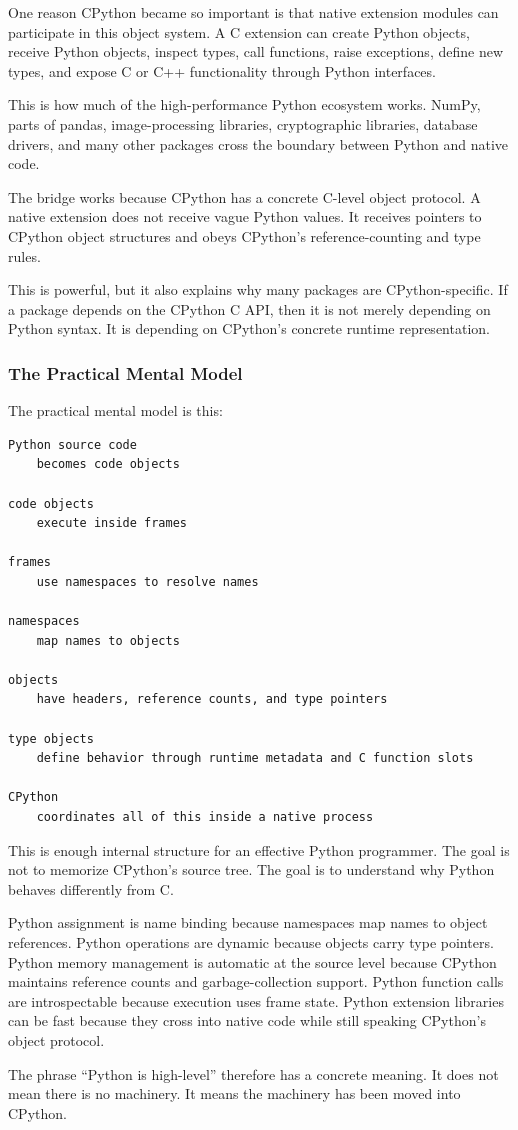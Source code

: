 One reason CPython became so important is that native extension modules can participate in this object system. A C extension can create Python objects, receive Python objects, inspect types, call functions, raise exceptions, define new types, and expose C or C++ functionality through Python interfaces.

This is how much of the high-performance Python ecosystem works. NumPy, parts of pandas, image-processing libraries, cryptographic libraries, database drivers, and many other packages cross the boundary between Python and native code.

The bridge works because CPython has a concrete C-level object protocol. A native extension does not receive vague Python values. It receives pointers to CPython object structures and obeys CPython's reference-counting and type rules.

This is powerful, but it also explains why many packages are CPython-specific. If a package depends on the CPython C API, then it is not merely depending on Python syntax. It is depending on CPython's concrete runtime representation.

\subsubsection{The Practical Mental Model}

The practical mental model is this:

\begin{verbatim}
Python source code
    becomes code objects

code objects
    execute inside frames

frames
    use namespaces to resolve names

namespaces
    map names to objects

objects
    have headers, reference counts, and type pointers

type objects
    define behavior through runtime metadata and C function slots

CPython
    coordinates all of this inside a native process
\end{verbatim}

This is enough internal structure for an effective Python programmer. The goal is not to memorize CPython's source tree. The goal is to understand why Python behaves differently from C.

Python assignment is name binding because namespaces map names to object references. Python operations are dynamic because objects carry type pointers. Python memory management is automatic at the source level because CPython maintains reference counts and garbage-collection support. Python function calls are introspectable because execution uses frame state. Python extension libraries can be fast because they cross into native code while still speaking CPython's object protocol.

The phrase ``Python is high-level'' therefore has a concrete meaning. It does not mean there is no machinery. It means the machinery has been moved into CPython.